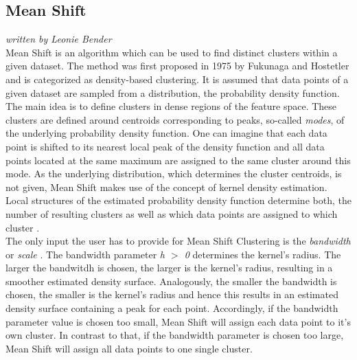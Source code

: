 \subsection{Mean Shift}
\textit{written by Leonie Bender}\\
\label{sec:Mean Shift}
Mean Shift is an algorithm which can be used to find distinct clusters within a given dataset. 
The method was first proposed in 1975 by Fukunaga and Hostetler \cite{fukunaga1975estimation} and is categorized as density-based clustering.
It is assumed that data points of a given dataset are sampled from a distribution, the probability density function. The main idea is to define clusters in dense regions of the feature space. These clusters are defined around centroids corresponding to peaks, so-called \textit{modes}, of the underlying probability density function. One can imagine that each data point is shifted to its nearest local peak of the density function and all data points located at the same maximum are assigned to the same cluster around this mode. As the underlying distribution, which determines the cluster centroids, is not given, Mean Shift makes use of the concept of kernel density estimation. Local structures of the estimated probability density function determine both, the number of resulting clusters as well as which data points are assigned to which cluster \cite{comaniciu2002MeanShift}.  \\
The only input the user has to provide for Mean Shift Clustering is the \textit{bandwidth} or \textit{scale} \cite{scikit-learn}. The bandwidth parameter \textit{h $>$ 0} determines the kernel's radius. The larger the bandwitdh is chosen, the larger is the kernel's radius, resulting in a smoother estimated density surface. Analogously, the smaller the bandwidth is chosen, the smaller is the kernel's radius and hence this results in an estimated density surface containing a peak for each point.
Accordingly, if the bandwidth parameter value is chosen too small, Mean Shift will assign each data point to it's own cluster. In contrast to that, if the bandwidth parameter is chosen too large, Mean Shift will assign all data points to one single cluster.  

